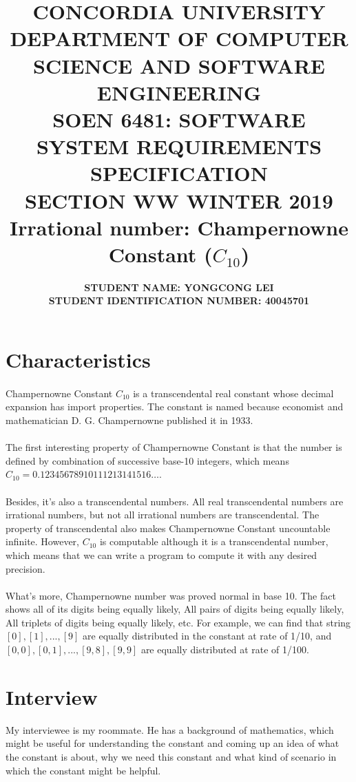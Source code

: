 \documentclass[10pt]{article}
\title{{\large \textbf{CONCORDIA UNIVERSITY \\ DEPARTMENT OF COMPUTER SCIENCE AND SOFTWARE ENGINEERING \\ SOEN 6481: SOFTWARE SYSTEM REQUIREMENTS SPECIFICATION \\ SECTION WW WINTER 2019 \\ Irrational number: Champernowne Constant ($C_{10}$)}  \\ }}
\author{\normalsize \textbf {STUDENT NAME: YONGCONG LEI} \\ \normalsize \textbf{STUDENT IDENTIFICATION NUMBER: 40045701 }}
\date{}
\begin{document}
\maketitle

\section{Characteristics}
\paragraph{}
Champernowne Constant $C_{10}$ is a transcendental real constant whose decimal expansion has import properties. The constant is named because economist and mathematician D. G. Champernowne published it in 1933.

\paragraph{}
The first interesting property of Champernowne Constant is that the number is defined by combination of successive base-10 integers, which means $C_{10} = 0.12345678910111213141516…$.

\paragraph{}
Besides, it's also a transcendental numbers. All real transcendental numbers are irrational numbers, but not all irrational numbers are transcendental. The property of transcendental also makes Champernowne Constant uncountable infinite. However, $C_{10}$ is computable  although it is a transcendental number, which means that we can write a program to compute it with any desired precision.

\paragraph{}
What's more, Champernowne number was proved normal in base 10. The fact shows all of its digits being equally likely, All pairs of digits being equally likely, All triplets of digits being equally likely, etc. For example, we can find that string $[0], [1], ..., [9]$ are equally distributed in the constant at rate of 1/10, and $ [0,0],[0,1],...,[9,8],[9,9]$ are equally distributed at rate of 1/100.

\pagebreak

\section{Interview}
My interviewee is my roommate. He has a background of mathematics, which might be useful for understanding the constant and coming up an idea of what the constant is about, why we need this constant and what kind of scenario in which the constant might be helpful.
\end{document}
